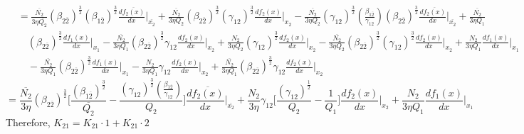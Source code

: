 \documentclass[fleqn, 10pt]{article}
\begin{document}
                            \begin{equation*}
                            \begin{split}
                                &=  \frac{\overline{N_2}}{3 \eta \overline{Q_2}} (\beta_{2\overline{2}})^\frac{3}{2} (\beta_{1\overline{2}})^\frac{3}{2} \frac{d\overline{f_2(x)}}{dx} \Bigg|_{\overline{x_2}} +   \frac{\overline{N_2}}{3 \eta Q_2} (\beta_{2\overline{2}})^\frac{3}{2} (\gamma_{12})^\frac{3}{2} \frac{df_2(x)}{dx} \Bigg|_{x_2} -   \frac{\overline{N_2}}{3 \eta Q_2} (\gamma_{12})^\frac{3}{2} \left(\frac{\beta_{1\overline{2}}}{\gamma_{12}}\right)(\beta_{2\overline{2}})^\frac{3}{2} \frac{d\overline{f_2(x)}}{dx} \Bigg|_{\overline{x_2}} +   \frac{\overline{N_2}}{3 \eta Q_1}\\ & \quad (\beta_{2\overline{2}})^\frac{3}{2} \frac{df_1(x)}{dx} \Bigg|_{x_1}  -   \frac{\overline{N_2}}{3 \eta Q_1} (\beta_{2\overline{2}})^\frac{3}{2} \gamma_{12} \frac{df_2(x)}{dx} \Bigg|_{x_2} +   \frac{N_2}{3 \eta Q_2} (\gamma_{12})^\frac{3}{2} \frac{df_2(x)}{dx} \Bigg|_{x_2} -   \frac{\overline{N_2}}{3 \eta Q_2} (\beta_{2\overline{2}})^\frac{3}{2} (\gamma_{12})^\frac{3}{2} \frac{df_2(x)}{dx} \Bigg|_{x_2} +   \frac{N_2}{3 \eta Q_1} \frac{df_1(x)}{dx} \Bigg|_{x_1} \\ & \quad -   \frac{\overline{N_2}}{3 \eta Q_1} (\beta_{2\overline{2}})^\frac{3}{2} \frac{df_1(x)}{dx} \Bigg|_{x_1} -   \frac{N_2}{3 \eta Q_1} \gamma_{12} \frac{df_2(x)}{dx} \Bigg|_{x_2} +   \frac{\overline{N_2}}{3 \eta Q_1} (\beta_{2\overline{2}})^\frac{3}{2} \gamma_{12} \frac{df_2(x)}{dx} \Bigg|_{x_2}
                                \end{split}
                            \end{equation*}
                            \begin{equation}
                                = \frac{\overline{N_2}}{3 \eta} (\beta_{2\overline{2}})^\frac{3}{2} \Biggl[ \frac{(\beta_{1\overline{2}})^\frac{3}{2}}{\overline{Q_2}} -   \frac{(\gamma_{12})^\frac{3}{2} \left(\frac{\beta_{1\overline{2}}}{\gamma_{12}}\right)}{Q_2} \Biggr] \frac{d\overline{f_2(x)}}{dx} \Bigg|_{\overline{x_2}} + \frac{N_2}{3 \eta} \gamma_{12} \biggl[ \frac{(\gamma_{12})^\frac{1}{2}}{Q_2} -   \frac{1}{Q_1} \biggr] \frac{df_2(x)}{dx} \Bigg|_{x_2} +   \frac{N_2}{3 \eta Q_1} \frac{df_1(x)}{dx} \Bigg|_{x_1}
                                \label{87}
                            \end{equation}
                            Therefore, $K_{21} = K_{21} \cdot 1 + K_{21} \cdot 2$
\end{document}
